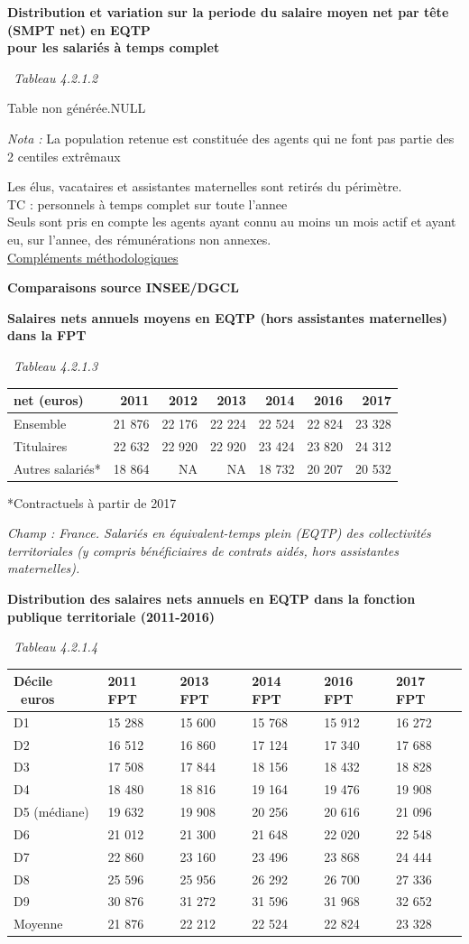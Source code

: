 \textbf{Distribution et variation sur la periode du salaire moyen net
par tête (SMPT net) en EQTP}\\
\textbf{pour les salariés à temps complet}

~\emph{Tableau 4.2.1.2}

Table non générée.NULL

\emph{Nota :} La population retenue est constituée des agents qui ne
font pas partie des 2 centiles extrêmaux

Les élus, vacataires et assistantes maternelles sont retirés du
périmètre.\\
TC : personnels à temps complet sur toute l'annee\\
Seuls sont pris en compte les agents ayant connu au moins un mois actif
et ayant eu, sur l'annee, des rémunérations non annexes.\\
\href{../Docs/méthodologie.pdf}{Compléments méthodologiques}

\textbf{Comparaisons source INSEE/DGCL}

\textbf{Salaires nets annuels moyens en EQTP (hors assistantes
maternelles) dans la FPT}

~\emph{Tableau 4.2.1.3}

\begin{longtable}[]{@{}lrrrrrr@{}}
\toprule
net (euros) & 2011 & 2012 & 2013 & 2014 & 2016 & 2017\tabularnewline
\midrule
\endhead
Ensemble & 21 876 & 22 176 & 22 224 & 22 524 & 22 824 & 23
328\tabularnewline
Titulaires & 22 632 & 22 920 & 22 920 & 23 424 & 23 820 & 24
312\tabularnewline
Autres salariés* & 18 864 & NA & NA & 18 732 & 20 207 & 20
532\tabularnewline
\bottomrule
\end{longtable}

*Contractuels à partir de 2017

\emph{Champ : France. Salariés en équivalent-temps plein (EQTP) des
collectivités territoriales (y compris bénéficiaires de contrats aidés,
hors assistantes maternelles).}

\textbf{Distribution des salaires nets annuels en EQTP dans la fonction
publique territoriale (2011-2016)}

~\emph{Tableau 4.2.1.4}

\begin{longtable}[]{@{}llllll@{}}
\toprule
Décile ~euros & 2011 FPT & 2013 FPT & 2014 FPT & 2016 FPT & 2017
FPT\tabularnewline
\midrule
\endhead
D1 & 15 288 & 15 600 & 15 768 & 15 912 & 16 272\tabularnewline
D2 & 16 512 & 16 860 & 17 124 & 17 340 & 17 688\tabularnewline
D3 & 17 508 & 17 844 & 18 156 & 18 432 & 18 828\tabularnewline
D4 & 18 480 & 18 816 & 19 164 & 19 476 & 19 908\tabularnewline
D5 (médiane) & 19 632 & 19 908 & 20 256 & 20 616 & 21 096\tabularnewline
D6 & 21 012 & 21 300 & 21 648 & 22 020 & 22 548\tabularnewline
D7 & 22 860 & 23 160 & 23 496 & 23 868 & 24 444\tabularnewline
D8 & 25 596 & 25 956 & 26 292 & 26 700 & 27 336\tabularnewline
D9 & 30 876 & 31 272 & 31 596 & 31 968 & 32 652\tabularnewline
Moyenne & 21 876 & 22 212 & 22 524 & 22 824 & 23 328\tabularnewline
\bottomrule
\end{longtable}

